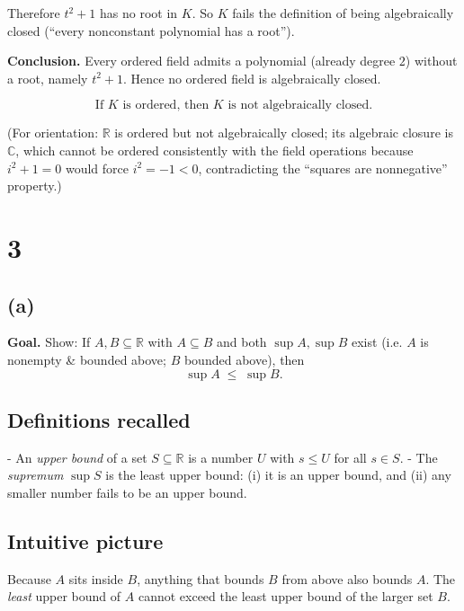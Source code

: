 \documentclass[12pt,a4paper]{article}
\theoremstyle{definition}
\theoremstyle{remark}
\begin{document}
Therefore \(t^2 + 1\) has no root in \(K\). So \(K\) fails the definition of being algebraically closed (“every nonconstant polynomial has a root”).

\textbf{Conclusion.} Every ordered field admits a polynomial (already degree \(2\)) without a root, namely \(t^2 + 1\). Hence no ordered field is algebraically closed.

\[
\boxed{\text{If } K \text{ is ordered, then } K \text{ is not algebraically closed.}}
\]

(For orientation: \(\mathbb{R}\) is ordered but not algebraically closed; its algebraic closure is \(\mathbb{C}\), which cannot be ordered consistently with the field operations because \(i^2 + 1 = 0\) would force \(i^2 = -1 < 0\), contradicting the “squares are nonnegative” property.)


\section*{3}
\subsection*{(a)}

\textbf{Goal.} Show: If \(A,B\subseteq \mathbb{R}\) with \(A\subseteq B\) and both \(\sup A,\sup B\) exist (i.e. \(A\) is nonempty \& bounded above; \(B\) bounded above), then
\[
\sup A \;\le\; \sup B.
\]



\subsection*{Definitions recalled}

- An \emph{upper bound} of a set \(S\subseteq \mathbb{R}\) is a number \(U\) with \(s\le U\) for all \(s\in S\).
- The \emph{supremum} \(\sup S\) is the least upper bound: (i) it is an upper bound, and (ii) any smaller number fails to be an upper bound.



\subsection*{Intuitive picture}

Because \(A\) sits inside \(B\), anything that bounds \(B\) from above also bounds \(A\). The \emph{least} upper bound of \(A\) cannot exceed the least upper bound of the larger set \(B\).
\end{document}
